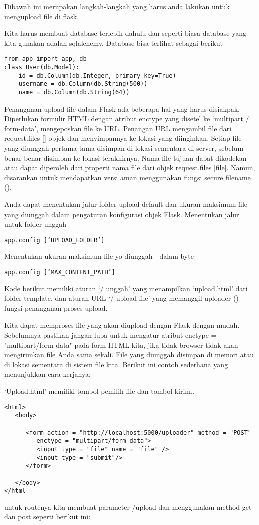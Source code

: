 \documentclass[12pt,a4paper]{article}
\begin{document}
Dibawah ini merupakan langkah-langkah yang harus anda lakukan untuk mengupload file di flask.

Kita harus membuat database terlebih dahulu dan seperti biasa database yang kita gunakan adalah sqlalchemy. Database bisa terlihat sebagai berikut
\begin{verbatim}
from app import app, db
class User(db.Model):
    id = db.Column(db.Integer, primary_key=True)
    username = db.Column(db.String(500))
    name = db.Column(db.String(64))
\end{verbatim}

Penanganan upload file dalam Flask ada beberapa hal yang harus disiakpak. Diperlukan formulir HTML dengan atribut enctype yang disetel ke ‘multipart / form-data’, mengeposkan file ke URL. Penangan URL mengambil file dari request.files [] objek dan menyimpannya ke lokasi yang diinginkan.
Setiap file yang diunggah pertama-tama disimpan di lokasi sementara di server, sebelum benar-benar disimpan ke lokasi terakhirnya. Nama file tujuan dapat dikodekan atau dapat diperoleh dari properti nama file dari objek request.files [file]. Namun, disarankan untuk mendapatkan versi aman menggunakan fungsi secure filename ().

Anda dapat menentukan jalur folder upload default dan ukuran maksimum file yang diunggah dalam pengaturan konfigurasi objek Flask.
Menentukan jalur untuk folder unggah
\begin{verbatim}
app.config [‘UPLOAD_FOLDER’] 
\end{verbatim}
Menentukan ukuran maksimum file yo diunggah - dalam byte
\begin{verbatim}
app.config [‘MAX_CONTENT_PATH’] 
\end{verbatim}
Kode berikut memiliki aturan ‘/ unggah’ yang menampilkan ‘upload.html’ dari folder template, dan aturan URL ‘/ upload-file’ yang memanggil uploader () fungsi penanganan proses upload.

Kita dapat memproses file yang akan diupload dengan Flask dengan mudah. Sebelumnya pastikan jangan lupa untuk mengatur atribut enctype = "multipart/form-data" pada form HTML kita, jika tidak browser tidak akan mengirimkan file Anda sama sekali. File yang diunggah disimpan di memori atau di lokasi sementara di sistem file kita. Berikut ini contoh sederhana yang menunjukkan cara kerjanya:

‘Upload.html’ memiliki tombol pemilih file dan tombol kirim..
\begin{verbatim}
<html>
   <body>
   
      <form action = "http://localhost:5000/uploader" method = "POST" 
         enctype = "multipart/form-data">
         <input type = "file" name = "file" />
         <input type = "submit"/>
      </form>
      
   </body>
</html
\end{verbatim}
untuk routenya kita membuat parameter /upload dan menggunakan method get dan post seperti berikut ini:
\end{document}
